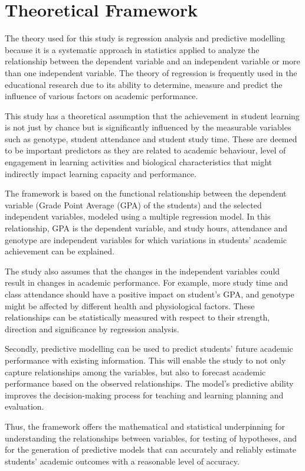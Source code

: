 \documentclass[12pt]{report}
\begin{document}
	\section{Theoretical Framework}
	The theory used for this study is regression analysis and predictive modelling because it is a systematic approach in statistics applied to analyze the relationship between the dependent variable and an independent variable or more than one independent variable. The theory of regression is frequently used in the educational research due to its ability to determine, measure and predict the influence of various factors on academic performance.
	
	This study has a theoretical assumption that the achievement in student learning is not just by chance but is significantly influenced by the measurable variables such as genotype, student attendance and student study time. These are deemed to be important predictors as they are related to academic behaviour, level of engagement in learning activities and biological characteristics that might indirectly impact learning capacity and performance.
	
	The framework is based on the functional relationship between the dependent variable (Grade Point Average (GPA) of the students) and the selected independent variables, modeled using a multiple regression model. In this relationship, GPA is the dependent variable, and study hours, attendance and genotype are independent variables for which variations in students' academic achievement can be explained.
	
	The study also assumes that the changes in the independent variables could result in changes in academic performance. For example, more study time and class attendance should have a positive impact on student's GPA, and genotype might be affected by different health and physiological factors. These relationships can be statistically measured with respect to their strength, direction and significance by regression analysis.
	
	Secondly, predictive modelling can be used to predict students' future academic performance with existing information. This will enable the study to not only capture relationships among the variables, but also to forecast academic performance based on the observed relationships. The model's predictive ability improves the decision-making process for teaching and learning planning and evaluation.
	
	Thus, the framework offers the mathematical and statistical underpinning for understanding the relationships between variables, for testing of hypotheses, and for the generation of predictive models that can accurately and reliably estimate students' academic outcomes with a reasonable level of accuracy.
	
\end{document}
